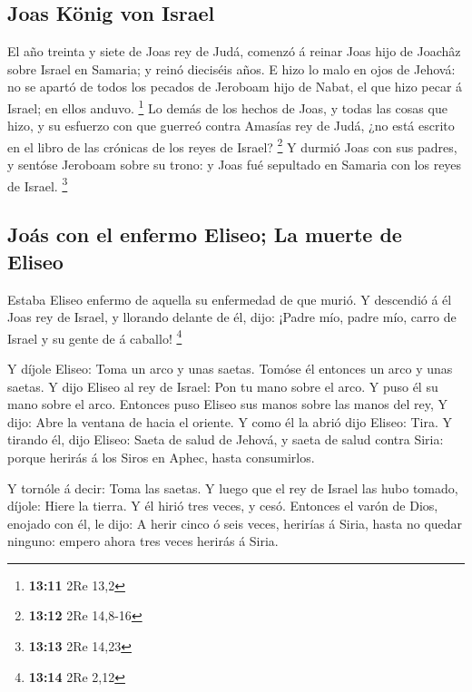 \hypertarget{joas-kuxf6nig-von-israel}{%
\subsection{Joas König von Israel}\label{joas-kuxf6nig-von-israel}}

 El año treinta y siete de Joas rey de Judá, comenzó á
reinar Joas hijo de Joachâz sobre Israel en Samaria; y reinó dieciséis
años.  E hizo lo malo en ojos de Jehová: no se apartó de
todos los pecados de Jeroboam hijo de Nabat, el que hizo pecar á Israel;
en ellos anduvo. \footnote{\textbf{13:11} 2Re 13,2}  Lo
demás de los hechos de Joas, y todas las cosas que hizo, y su esfuerzo
con que guerreó contra Amasías rey de Judá, ¿no está escrito en el libro
de las crónicas de los reyes de Israel? \footnote{\textbf{13:12} 2Re
  14,8-16}  Y durmió Joas con sus padres, y sentóse
Jeroboam sobre su trono: y Joas fué sepultado en Samaria con los reyes
de Israel. \footnote{\textbf{13:13} 2Re 14,23}

\hypertarget{jouxe1s-con-el-enfermo-eliseo-la-muerte-de-eliseo}{%
\subsection{Joás con el enfermo Eliseo; La muerte de
Eliseo}\label{jouxe1s-con-el-enfermo-eliseo-la-muerte-de-eliseo}}

 Estaba Eliseo enfermo de aquella su enfermedad de que
murió. Y descendió á él Joas rey de Israel, y llorando delante de él,
dijo: ¡Padre mío, padre mío, carro de Israel y su gente de á caballo!
\footnote{\textbf{13:14} 2Re 2,12}

 Y díjole Eliseo: Toma un arco y unas saetas. Tomóse él
entonces un arco y unas saetas.  Y dijo Eliseo al rey de
Israel: Pon tu mano sobre el arco. Y puso él su mano sobre el arco.
Entonces puso Eliseo sus manos sobre las manos del rey, 
Y dijo: Abre la ventana de hacia el oriente. Y como él la abrió dijo
Eliseo: Tira. Y tirando él, dijo Eliseo: Saeta de salud de Jehová, y
saeta de salud contra Siria: porque herirás á los Siros en Aphec, hasta
consumirlos.

 Y tornóle á decir: Toma las saetas. Y luego que el rey
de Israel las hubo tomado, díjole: Hiere la tierra. Y él hirió tres
veces, y cesó.  Entonces el varón de Dios, enojado con
él, le dijo: A herir cinco ó seis veces, herirías á Siria, hasta no
quedar ninguno: empero ahora tres veces herirás á Siria.

